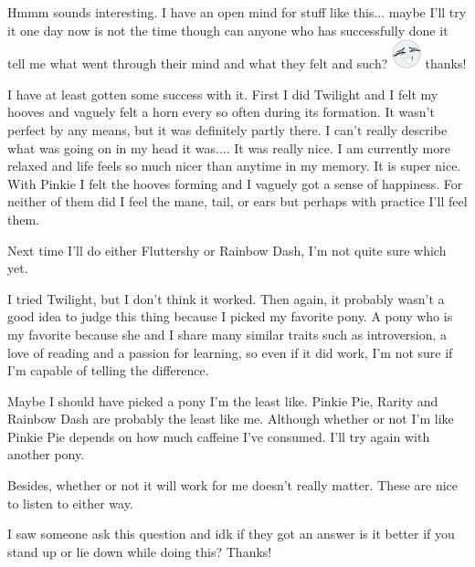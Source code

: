\documentclass[ebook,12pt,oneside,openany]{memoir}
\begin{document}
\begin{tcolorbox}[title=Sleepykitty]
\begin{tcolorbox}[title=pokesonicfan11]
\par{Hmmm sounds interesting. I have an open mind for stuff like this... maybe I'll try it one day now is not the time though can anyone who has successfully done it tell me what went through their mind and what they felt and such? \includegraphics{images/mlp_8pfRZzv.png} thanks!}
\end{tcolorbox}
\par{I have at least gotten some success with it. First I did Twilight and I felt my hooves and vaguely felt a horn every so often during its formation. It wasn't perfect by any means, but it was definitely partly there. I can't really describe what was going on in my head it was.... It was really nice. I am currently more relaxed and life feels so much nicer than anytime in my memory. It is super nice. With Pinkie I felt the hooves forming and I vaguely got a sense of happiness. For neither of them did I feel the mane, tail, or ears but perhaps with practice I'll feel them.}
\par{Next time I'll do either Fluttershy or Rainbow Dash, I'm not quite sure which yet.}
\end{tcolorbox}
\begin{tcolorbox}[title=RoseLaflesh]
\par{I tried Twilight, but I don't think it worked. Then again, it probably wasn't a good idea to judge this thing because I picked my favorite pony. A pony who is my favorite because she and I share many similar traits such as introversion, a love of reading and a passion for learning, so even if it did work, I'm not sure if I'm capable of telling the difference.}
\newline{}
\par{Maybe I should have picked a pony I'm the least like. Pinkie Pie, Rarity and Rainbow Dash are probably the least like me. Although whether or not I'm like Pinkie Pie depends on how much caffeine I've consumed. I'll try again with another pony. }
\newline{}
\par{Besides, whether or not it will work for me doesn't really matter. These are nice to listen to either way.}
\end{tcolorbox}
\begin{tcolorbox}[title=Sanic Screwdriver]
\par{I saw someone ask this question and idk if they got an answer is it better if you stand up or lie down while doing this? Thanks!}
\end{tcolorbox}
\end{document}
